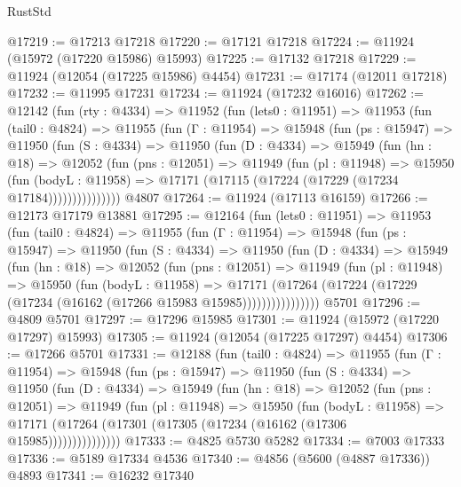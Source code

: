 \begin{lexlean}{RustStd}
\begin{coremodule}
{\begin{coremodule}
{{{{{{{{{{{{{{{{{{{{{{{{{{{{{{{{{{{{{{{{{{{{{{{{{{{{{{{{{{{{{{{{{{{{{{{{{{{{{{{{@17219 := @17213 @17218
@17220 := @17121 @17218
@17224 := @11924 (@15972 (@17220 @15986) @15993)
@17225 := @17132 @17218
@17229 := @11924 (@12054 (@17225 @15986) @4454)
@17231 := @17174 (@12011 @17218)
@17232 := @11995 @17231
@17234 := @11924 (@17232 @16016)
@17262 := @12142
    (fun (rty : @4334) =>
    @11952
      (fun (lets0 : @11951) =>
      @11953
        (fun (tail0 : @4824) =>
        @11955
          (fun (Γ : @11954) =>
          @15948
            (fun (ps : @15947) =>
            @11950
              (fun (S : @4334) =>
              @11950
                (fun (D : @4334) =>
                @15949
                  (fun (hn : @18) =>
                  @12052
                    (fun (pns : @12051) =>
                    @11949
                      (fun (pl : @11948) =>
                      @15950
                        (fun (bodyL : @11958) =>
                        @17171 (@17115 (@17224 (@17229 (@17234 @17184)))))))))))))))
    @4807
@17264 := @11924 (@17113 @16159)
@17266 := @12173 @17179 @13881
@17295 := @12164
    (fun (lets0 : @11951) =>
    @11953
      (fun (tail0 : @4824) =>
      @11955
        (fun (Γ : @11954) =>
        @15948
          (fun (ps : @15947) =>
          @11950
            (fun (S : @4334) =>
            @11950
              (fun (D : @4334) =>
              @15949
                (fun (hn : @18) =>
                @12052
                  (fun (pns : @12051) =>
                  @11949
                    (fun (pl : @11948) =>
                    @15950
                      (fun (bodyL : @11958) =>
                      @17171
                        (@17264
                          (@17224 (@17229 (@17234 (@16162 (@17266 @15983 @15985))))))))))))))))
    @5701
@17296 := @4809 @5701
@17297 := @17296 @15985
@17301 := @11924 (@15972 (@17220 @17297) @15993)
@17305 := @11924 (@12054 (@17225 @17297) @4454)
@17306 := @17266 @5701
@17331 := @12188
    (fun (tail0 : @4824) =>
    @11955
      (fun (Γ : @11954) =>
      @15948
        (fun (ps : @15947) =>
        @11950
          (fun (S : @4334) =>
          @11950
            (fun (D : @4334) =>
            @15949
              (fun (hn : @18) =>
              @12052
                (fun (pns : @12051) =>
                @11949
                  (fun (pl : @11948) =>
                  @15950
                    (fun (bodyL : @11958) =>
                    @17171 (@17264 (@17301 (@17305 (@17234 (@16162 (@17306 @15985)))))))))))))))
@17333 := @4825 @5730 @5282
@17334 := @7003 @17333
@17336 := @5189 @17334 @4536
@17340 := @4856 (@5600 (@4887 @17336)) @4893
@17341 := @16232 @17340
}}}}}}}}}}}}}}}}}}}}}}}}}}}}}}}}}}}}}}}}}}}}}}}}}}}}}}}}}}}}}}}}}}}}}}}}}}}}}}}}
\end{coremodule}}
\end{coremodule}
\end{lexlean}
